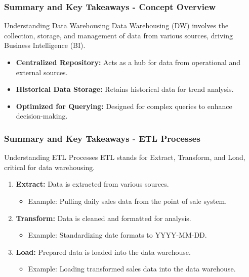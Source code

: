 \documentclass{beamer}
\begin{document}
\begin{frame}[fragile]
    \frametitle{Summary and Key Takeaways - Concept Overview}
    \begin{block}{Understanding Data Warehousing}
        Data Warehousing (DW) involves the collection, storage, and management of data from various sources, driving Business Intelligence (BI).
    \end{block}
    \begin{itemize}
        \item \textbf{Centralized Repository:} Acts as a hub for data from operational and external sources.
        \item \textbf{Historical Data Storage:} Retains historical data for trend analysis.
        \item \textbf{Optimized for Querying:} Designed for complex queries to enhance decision-making.
    \end{itemize}
\end{frame}

\begin{frame}[fragile]
    \frametitle{Summary and Key Takeaways - ETL Processes}
    \begin{block}{Understanding ETL Processes}
        ETL stands for Extract, Transform, and Load, critical for data warehousing.
    \end{block}
    \begin{enumerate}
        \item \textbf{Extract:} Data is extracted from various sources.
            \begin{itemize}
                \item Example: Pulling daily sales data from the point of sale system.
            \end{itemize}
        \item \textbf{Transform:} Data is cleaned and formatted for analysis.
            \begin{itemize}
                \item Example: Standardizing date formats to YYYY-MM-DD.
            \end{itemize}
        \item \textbf{Load:} Prepared data is loaded into the data warehouse.
            \begin{itemize}
                \item Example: Loading transformed sales data into the data warehouse.
            \end{itemize}
    \end{enumerate}
\end{frame}
\end{document}
